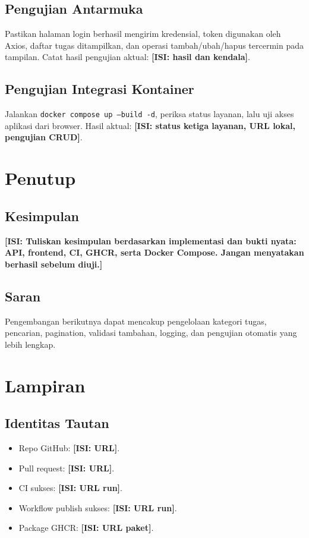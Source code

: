 \documentclass[12pt,a4paper]{report}
\newcommand{\isian}[1]{\textbf{[ISI: #1]}}
\begin{document}
\section{Pengujian Antarmuka}
Pastikan halaman login berhasil mengirim kredensial, token digunakan oleh Axios, daftar tugas ditampilkan, dan operasi tambah/ubah/hapus tercermin pada tampilan. Catat hasil pengujian aktual: \isian{hasil dan kendala}.

\section{Pengujian Integrasi Kontainer}
Jalankan \texttt{docker compose up --build -d}, periksa status layanan, lalu uji akses aplikasi dari browser. Hasil aktual: \isian{status ketiga layanan, URL lokal, pengujian CRUD}.

\chapter{Penutup}
\section{Kesimpulan}
\isian{Tuliskan kesimpulan berdasarkan implementasi dan bukti nyata: API, frontend, CI, GHCR, serta Docker Compose. Jangan menyatakan berhasil sebelum diuji.}
\section{Saran}
Pengembangan berikutnya dapat mencakup pengelolaan kategori tugas, pencarian, pagination, validasi tambahan, logging, dan pengujian otomatis yang lebih lengkap.

\appendix
\chapter{Lampiran}
\section{Identitas Tautan}
\begin{itemize}
\item Repo GitHub: \isian{URL}.
\item Pull request: \isian{URL}.
\item CI sukses: \isian{URL run}.
\item Workflow publish sukses: \isian{URL run}.
\item Package GHCR: \isian{URL paket}.
\end{itemize}
\end{document}
